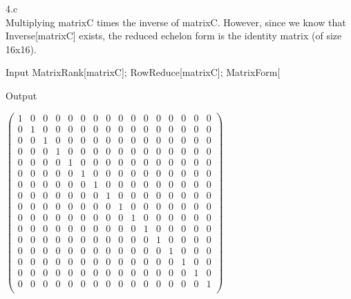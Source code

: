 \documentclass[11pt,a4paper]{article}
\begin{document}
\clearpage

4.c\\
Multiplying matrixC times the inverse of matrixC. However, since we know that Inverse[matrixC] exists, the reduced echelon form is the identity matrix
(of size 16x16).

\begin{mmaCell}[moredefined={matrixC}]{Input}
MatrixRank[matrixC];
RowReduce[matrixC];
MatrixForm[%
\end{mmaCell}

\begin{mmaCell}[form=MatrixForm]{Output}

\end{mmaCell}

\begin{doublespace}
\noindent\(\left(
\begin{array}{cccccccccccccccc}
 1 & 0 & 0 & 0 & 0 & 0 & 0 & 0 & 0 & 0 & 0 & 0 & 0 & 0 & 0 & 0 \\
 0 & 1 & 0 & 0 & 0 & 0 & 0 & 0 & 0 & 0 & 0 & 0 & 0 & 0 & 0 & 0 \\
 0 & 0 & 1 & 0 & 0 & 0 & 0 & 0 & 0 & 0 & 0 & 0 & 0 & 0 & 0 & 0 \\
 0 & 0 & 0 & 1 & 0 & 0 & 0 & 0 & 0 & 0 & 0 & 0 & 0 & 0 & 0 & 0 \\
 0 & 0 & 0 & 0 & 1 & 0 & 0 & 0 & 0 & 0 & 0 & 0 & 0 & 0 & 0 & 0 \\
 0 & 0 & 0 & 0 & 0 & 1 & 0 & 0 & 0 & 0 & 0 & 0 & 0 & 0 & 0 & 0 \\
 0 & 0 & 0 & 0 & 0 & 0 & 1 & 0 & 0 & 0 & 0 & 0 & 0 & 0 & 0 & 0 \\
 0 & 0 & 0 & 0 & 0 & 0 & 0 & 1 & 0 & 0 & 0 & 0 & 0 & 0 & 0 & 0 \\
 0 & 0 & 0 & 0 & 0 & 0 & 0 & 0 & 1 & 0 & 0 & 0 & 0 & 0 & 0 & 0 \\
 0 & 0 & 0 & 0 & 0 & 0 & 0 & 0 & 0 & 1 & 0 & 0 & 0 & 0 & 0 & 0 \\
 0 & 0 & 0 & 0 & 0 & 0 & 0 & 0 & 0 & 0 & 1 & 0 & 0 & 0 & 0 & 0 \\
 0 & 0 & 0 & 0 & 0 & 0 & 0 & 0 & 0 & 0 & 0 & 1 & 0 & 0 & 0 & 0 \\
 0 & 0 & 0 & 0 & 0 & 0 & 0 & 0 & 0 & 0 & 0 & 0 & 1 & 0 & 0 & 0 \\
 0 & 0 & 0 & 0 & 0 & 0 & 0 & 0 & 0 & 0 & 0 & 0 & 0 & 1 & 0 & 0 \\
 0 & 0 & 0 & 0 & 0 & 0 & 0 & 0 & 0 & 0 & 0 & 0 & 0 & 0 & 1 & 0 \\
 0 & 0 & 0 & 0 & 0 & 0 & 0 & 0 & 0 & 0 & 0 & 0 & 0 & 0 & 0 & 1 \\
\end{array}
\right)\)
\end{doublespace}
\end{document}
